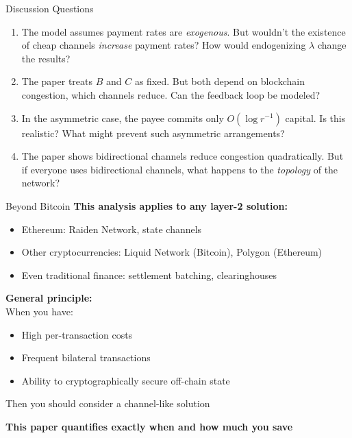 \documentclass[aspectratio=169,12pt]{beamer}
\begin{document}
\begin{frame}{Discussion Questions}
\begin{enumerate}
    \item The model assumes payment rates are \textit{exogenous}. But wouldn't the existence of cheap channels \textit{increase} payment rates? How would endogenizing $\lambda$ change the results?
    
    \vspace{0.3cm}
    \item The paper treats $B$ and $C$ as fixed. But both depend on blockchain congestion, which channels reduce. Can the feedback loop be modeled? 
    
    \vspace{0.3cm}
    \item In the asymmetric case, the payee commits only $O(\log r^{-1})$ capital. Is this realistic? What might prevent such asymmetric arrangements?
    
    \vspace{0.3cm}
    \item The paper shows bidirectional channels reduce congestion quadratically. But if everyone uses bidirectional channels, what happens to the \textit{topology} of the network?
\end{enumerate}
\end{frame}

\begin{frame}{Beyond Bitcoin}
\textbf{This analysis applies to any layer-2 solution:}

\begin{itemize}
    \item Ethereum: Raiden Network, state channels
    \item Other cryptocurrencies: Liquid Network (Bitcoin), Polygon (Ethereum)
    \item Even traditional finance: settlement batching, clearinghouses
\end{itemize}

\vspace{0.5cm}
\textbf{General principle:} \\
When you have:
\begin{itemize}
    \item High per-transaction costs
    \item Frequent bilateral transactions
    \item Ability to cryptographically secure off-chain state
\end{itemize}
Then you should consider a channel-like solution

\vspace{0.5cm}
\textbf{This paper quantifies exactly when and how much you save}
\end{frame}
\end{document}
